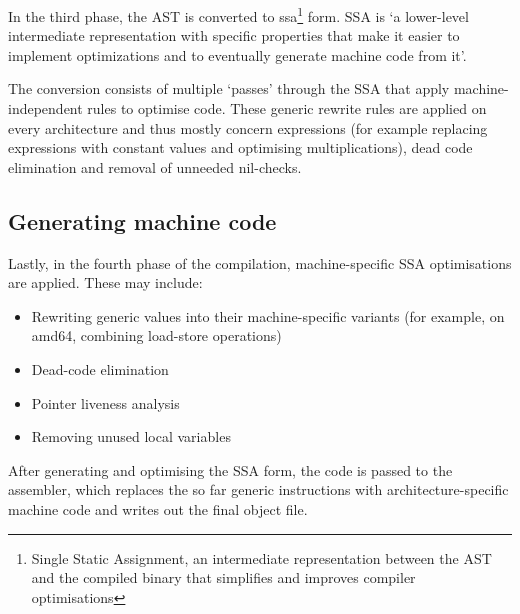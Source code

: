 In the third phase, the AST is converted to \gls{ssa}\footnote{Single Static Assignment,
an intermediate representation between the AST and the compiled binary that simplifies
and improves compiler optimisations} form. SSA  is `a
lower-level intermediate representation with specific properties that make it
easier to implement optimizations and to eventually generate machine code from
it'\autocite{compiler-readme}.

The conversion consists of multiple `passes' through the SSA that
apply machine-independent rules to optimise code. These generic
rewrite rules are applied on every architecture and thus mostly
concern expressions (for example replacing expressions with constant values and
optimising multiplications), dead code elimination and removal of unneeded
nil-checks.

\subsection{Generating machine code}

Lastly, in the fourth phase of the compilation, machine-specific
SSA optimisations are applied. These may include:
\begin{itemize}
    \item Rewriting generic values into their machine-specific variants
        (for example, on amd64, combining load-store operations)
    \item Dead-code elimination
    \item Pointer liveness analysis
    \item Removing unused local variables
\end{itemize}

After generating and optimising the SSA form, the code is passed to the
assembler, which replaces the so far generic instructions with
architecture-specific machine code and writes out the final object file\autocite{compiler-readme}.
